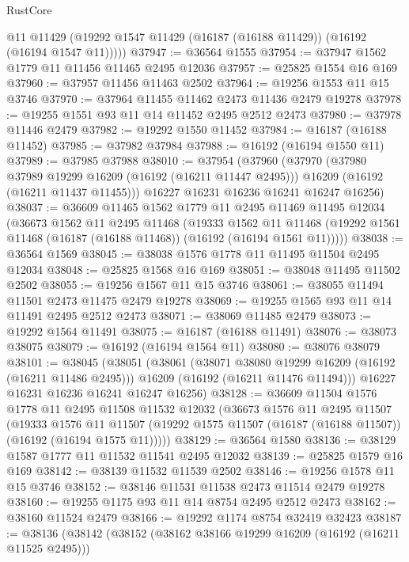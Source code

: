 \begin{lexlean}{RustCore}
\begin{coremodule}
        @11
        @11429
        (@19292 @1547 @11429 (@16187 (@16188 @11429)) (@16192 (@16194 @1547 @11)))))
@37947 := @36564 @1555
@37954 := @37947 @1562 @1779 @11 @11456 @11465 @2495 @12036
@37957 := @25825 @1554 @16 @169
@37960 := @37957 @11456 @11463 @2502
@37964 := @19256 @1553 @11 @15 @3746
@37970 := @37964 @11455 @11462 @2473 @11436 @2479 @19278
@37978 := @19255 @1551 @93 @11 @14 @11452 @2495 @2512 @2473
@37980 := @37978 @11446 @2479
@37982 := @19292 @1550 @11452
@37984 := @16187 (@16188 @11452)
@37985 := @37982 @37984
@37988 := @16192 (@16194 @1550 @11)
@37989 := @37985 @37988
@38010 := @37954
    (@37960
      (@37970
        (@37980 @37989 @19299 @16209 (@16192 (@16211 @11447 @2495)))
        @16209
        (@16192 (@16211 @11437 @11455)))
      @16227
      @16231
      @16236
      @16241
      @16247
      @16256)
@38037 := @36609
    @11465
    @1562
    @1779
    @11
    @2495
    @11469
    @11495
    @12034
    (@36673
      @1562
      @11
      @2495
      @11468
      (@19333
        @1562
        @11
        @11468
        (@19292 @1561 @11468 (@16187 (@16188 @11468)) (@16192 (@16194 @1561 @11)))))
@38038 := @36564 @1569
@38045 := @38038 @1576 @1778 @11 @11495 @11504 @2495 @12034
@38048 := @25825 @1568 @16 @169
@38051 := @38048 @11495 @11502 @2502
@38055 := @19256 @1567 @11 @15 @3746
@38061 := @38055 @11494 @11501 @2473 @11475 @2479 @19278
@38069 := @19255 @1565 @93 @11 @14 @11491 @2495 @2512 @2473
@38071 := @38069 @11485 @2479
@38073 := @19292 @1564 @11491
@38075 := @16187 (@16188 @11491)
@38076 := @38073 @38075
@38079 := @16192 (@16194 @1564 @11)
@38080 := @38076 @38079
@38101 := @38045
    (@38051
      (@38061
        (@38071 @38080 @19299 @16209 (@16192 (@16211 @11486 @2495)))
        @16209
        (@16192 (@16211 @11476 @11494)))
      @16227
      @16231
      @16236
      @16241
      @16247
      @16256)
@38128 := @36609
    @11504
    @1576
    @1778
    @11
    @2495
    @11508
    @11532
    @12032
    (@36673
      @1576
      @11
      @2495
      @11507
      (@19333
        @1576
        @11
        @11507
        (@19292 @1575 @11507 (@16187 (@16188 @11507)) (@16192 (@16194 @1575 @11)))))
@38129 := @36564 @1580
@38136 := @38129 @1587 @1777 @11 @11532 @11541 @2495 @12032
@38139 := @25825 @1579 @16 @169
@38142 := @38139 @11532 @11539 @2502
@38146 := @19256 @1578 @11 @15 @3746
@38152 := @38146 @11531 @11538 @2473 @11514 @2479 @19278
@38160 := @19255 @1175 @93 @11 @14 @8754 @2495 @2512 @2473
@38162 := @38160 @11524 @2479
@38166 := @19292 @1174 @8754 @32419 @32423
@38187 := @38136
    (@38142
      (@38152
        (@38162 @38166 @19299 @16209 (@16192 (@16211 @11525 @2495)))

\end{coremodule}
\end{lexlean}
